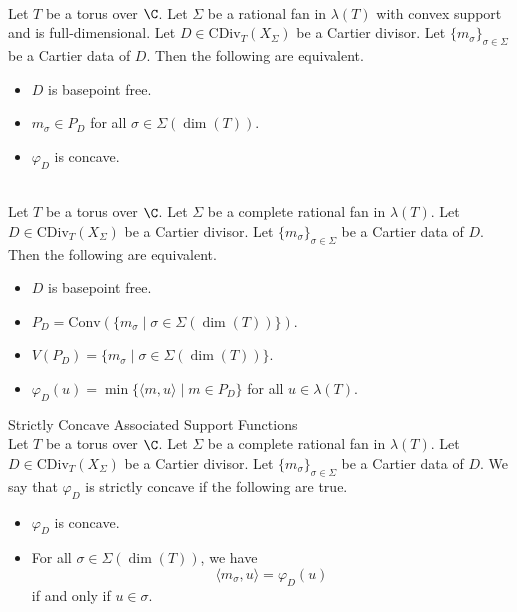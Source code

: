 \documentclass[a4paper]{article}
\begin{document}
\begin{prp}{}{}\\
Let $T$ be a torus over $\C$. Let $\Sigma$ be a rational fan in $\lambda(T)$ with convex support and is full-dimensional. Let $D\in\text{CDiv}_T(X_\Sigma)$ be a Cartier divisor. Let $\{m_\sigma\}_{\sigma\in\Sigma}$ be a Cartier data of $D$. Then the following are equivalent. 
\begin{itemize}
\item $D$ is basepoint free. 
\item $m_\sigma\in P_D$ for all $\sigma\in\Sigma(\dim(T))$. 
\item $\varphi_D$ is concave. 
\end{itemize}
\end{prp}

\begin{prp}{}{}\\
Let $T$ be a torus over $\C$. Let $\Sigma$ be a complete rational fan in $\lambda(T)$. Let $D\in\text{CDiv}_T(X_\Sigma)$ be a Cartier divisor. Let $\{m_\sigma\}_{\sigma\in\Sigma}$ be a Cartier data of $D$. Then the following are equivalent. 
\begin{itemize}
\item $D$ is basepoint free. 
\item $P_D=\text{Conv}(\{m_\sigma\;|\;\sigma\in\Sigma(\dim(T))\})$. 
\item $V(P_D)=\{m_\sigma\;|\;\sigma\in\Sigma(\dim(T))\}$. 
\item $\varphi_D(u)=\min\{\langle m,u\rangle\;|\;m\in P_D\}$ for all $u\in\lambda(T)$. 
\end{itemize}
\end{prp}

\begin{defn}{Strictly Concave Associated Support Functions}{}\\
Let $T$ be a torus over $\C$. Let $\Sigma$ be a complete rational fan in $\lambda(T)$. Let $D\in\text{CDiv}_T(X_\Sigma)$ be a Cartier divisor. Let $\{m_\sigma\}_{\sigma\in\Sigma}$ be a Cartier data of $D$. We say that $\varphi_D$ is strictly concave if the following are true. 
\begin{itemize}
\item $\varphi_D$ is concave. 
\item For all $\sigma\in\Sigma(\dim(T))$, we have $$\langle m_\sigma,u\rangle=\varphi_D(u)$$ if and only if $u\in\sigma$. 
\end{itemize}
\end{defn}
\end{document}
